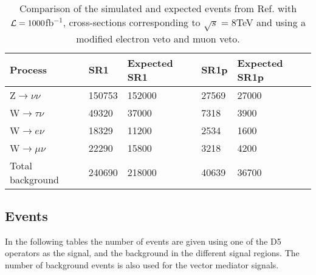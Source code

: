 \begin{table}[ht]
\begin{center}
\begin{tabular}{|l|l|l|l|l|}
\hline
Process & SR1  & Expected SR1 & SR1p & Expected SR1p  \\ \hline
Z$\rightarrow\nu\nu$ & 150753 & 152000 & 27569 & 27000 \\
W$\rightarrow\tau\nu$ & 49320 & 37000 & 7318 & 3900 \\
W$\rightarrow e\nu$ & 18329 & 11200 & 2534 & 1600 \\
W$\rightarrow\mu\nu$ & 22290 & 15800 & 3218 & 4200 \\ \hline
Total background & 240690 & 218000 & 40639 & 36700 \\ \hline
\end{tabular}
\caption{Comparison of the simulated and expected events from Ref. \citep{ATLAS-CONF-2012-147} with $\mathcal{L}=1000$fb$^{-1}$, cross-sections corresponding to $\sqrt{s}=8$TeV and using a modified electron veto and muon veto.}

\label{tab:newcomp}
\end{center}
\end{table}


\subsection{Events}
In the following tables the number of events are given using one of the D5 operators as the signal, and the background in the different signal regions. The number of background events is also used for the vector mediator signals.

